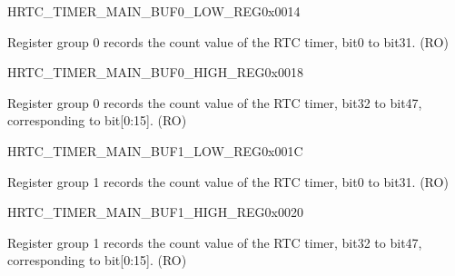 \begin{register}{H}{RTC\_TIMER\_MAIN\_BUF0\_LOW\_REG}{0x0014}\label{regdesc:RTCTIMERMAINBUF0LOWREG}
%
\regnewline%
\begin{regdesc}\begin{reglist}
\label{fielddesc:RTCTIMERMAINBUF0LOW}\item [RTC\_TIMER\_MAIN\_BUF0\_LOW] Register group 0 records the count value of the RTC timer, bit0 to bit31. (RO)
\end{reglist}\end{regdesc}
\end{register}

\begin{register}{H}{RTC\_TIMER\_MAIN\_BUF0\_HIGH\_REG}{0x0018}\label{regdesc:RTCTIMERMAINBUF0HIGHREG}
%
\regnewline%
\begin{regdesc}\begin{reglist}
\label{fielddesc:RTCTIMERMAINBUF0HIGH}\item [RTC\_TIMER\_MAIN\_BUF0\_HIGH] Register group 0 records the count value of the RTC timer, bit32 to bit47, corresponding to bit[0:15]. (RO)
\end{reglist}\end{regdesc}
\end{register}

\begin{register}{H}{RTC\_TIMER\_MAIN\_BUF1\_LOW\_REG}{0x001C}\label{regdesc:RTCTIMERMAINBUF1LOWREG}
%
\regnewline%
\begin{regdesc}\begin{reglist}
\label{fielddesc:RTCTIMERMAINBUF1LOW}\item [RTC\_TIMER\_MAIN\_BUF1\_LOW] Register group 1 records the count value of the RTC timer, bit0 to bit31. (RO)
\end{reglist}\end{regdesc}
\end{register}

\begin{register}{H}{RTC\_TIMER\_MAIN\_BUF1\_HIGH\_REG}{0x0020}\label{regdesc:RTCTIMERMAINBUF1HIGHREG}
%
\regnewline%
\begin{regdesc}\begin{reglist}
\label{fielddesc:RTCTIMERMAINBUF1HIGH}\item [RTC\_TIMER\_MAIN\_BUF1\_HIGH] Register group 1 records the count value of the RTC timer, bit32 to bit47, corresponding to bit[0:15]. (RO)
\end{reglist}\end{regdesc}
\end{register}

